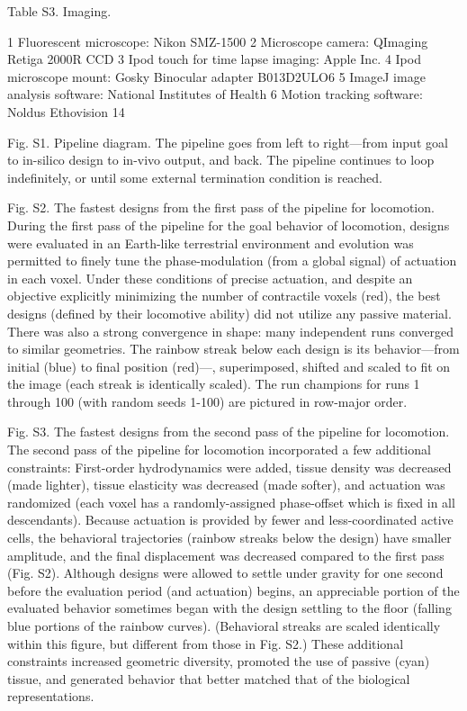 Table S3. Imaging.

1
Fluorescent microscope: 
Nikon SMZ-1500
2
Microscope camera: 	
QImaging Retiga 2000R CCD
3
Ipod touch for time lapse imaging: 	
Apple Inc.
4
Ipod microscope mount: 
Gosky Binocular adapter B013D2ULO6
5
ImageJ image analysis software: 
National Institutes of Health
6
Motion tracking software: 
Noldus Ethovision 14


Fig. S1.  Pipeline diagram. The pipeline goes from left to right---from input goal to in-silico design to in-vivo output, and back. The pipeline continues to loop indefinitely, or until some external termination condition is reached.





Fig. S2.  The fastest designs from the first pass of the pipeline for locomotion. During the first pass of the pipeline for the goal behavior of locomotion, designs were evaluated in an Earth-like terrestrial environment and evolution was permitted to finely tune the phase-modulation (from a global signal) of actuation in each voxel. Under these conditions of precise actuation, and despite an objective explicitly minimizing the number of contractile voxels (red), the best designs (defined by their locomotive ability) did not utilize any passive material. There was also a strong convergence in shape: many independent runs converged to similar geometries. The rainbow streak below each design is its behavior---from initial (blue) to final position (red)---, superimposed, shifted and scaled to fit on the image (each streak is identically scaled). The run champions for runs 1 through 100 (with random seeds 1-100) are pictured in row-major order.



Fig. S3.  The fastest designs from the second pass of the pipeline for locomotion. The second pass of the pipeline for locomotion incorporated a few additional constraints: First-order hydrodynamics were added, tissue density was decreased (made lighter), tissue elasticity was decreased (made softer), and actuation was randomized (each voxel has a randomly-assigned phase-offset which is fixed in all descendants). Because actuation is provided by fewer and less-coordinated active cells, the behavioral trajectories (rainbow streaks below the design) have smaller amplitude, and the final displacement was decreased compared to the first pass (Fig. S2). Although designs were allowed to settle under gravity for one second before the evaluation period (and actuation) begins, an appreciable portion of the evaluated behavior sometimes began with the design settling to the floor (falling blue portions of the rainbow curves). (Behavioral streaks are scaled identically within this figure, but different from those in Fig. S2.) These additional constraints increased geometric diversity, promoted the use of passive (cyan) tissue, and generated behavior that better matched that of the biological representations. 

